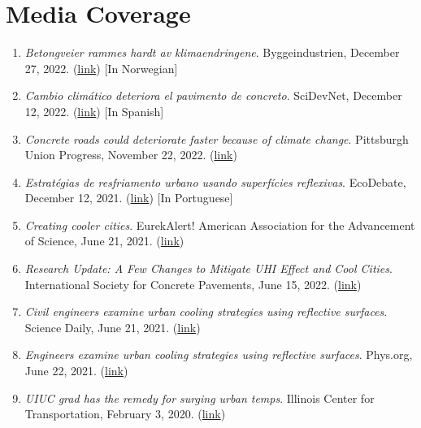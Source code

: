 \documentclass[12pt]{article}
\begin{document}
\bigskip
\section*{Media Coverage}
\hfill
\begin{enumerate}[label=(M\arabic*)]
	\item \textit{Betongveier rammes hardt av klimaendringene}. Byggeindustrien, December 27, 2022. (\href{https://www.bygg.no/betongveier-rammes-hardt-av-klimaendringene/1514889!/}{link}) [In Norwegian]
	\item \textit{Cambio climático deteriora el pavimento de concreto}. SciDevNet, December 12, 2022. (\href{https://www.scidev.net/america-latina/news/cambio-climatico-deteriora-el-pavimento-de-concreto//}{link}) [In Spanish]
	\item \textit{Concrete roads could deteriorate faster because of climate change}. Pittsburgh Union Progress, November 22, 2022. (\href{https://www.unionprogress.com/2022/11/22/concrete-roads-could-deteriorate-faster-because-of-climate-change/}{link})
	\item \textit{Estratégias de resfriamento urbano usando superfícies reflexivas}. EcoDebate, December 12, 2021. (\href{https://www.ecodebate.com.br/2021/06/21/estrategias-de-resfriamento-urbano-usando-superficies-reflexivas/}{link}) [In Portuguese]
	\item \textit{Creating cooler cities}. EurekAlert! American Association for the Advancement of Science, June 21, 2021. (\href{https://www.eurekalert.org/news-releases/536867}{link})
	\item \textit{Research Update: A Few Changes to Mitigate UHI Effect and Cool Cities}. International Society for Concrete Pavements, June 15, 2022. (\href{https://www.concretepavements.org/2021/06/15/18878/}{link})
	\item \textit{Civil engineers examine urban cooling strategies using reflective surfaces}. Science Daily, June 21, 2021. (\href{https://www.sciencedaily.com/releases/2021/06/210621174101.htm}{link})
	\item \textit{Engineers examine urban cooling strategies using reflective surfaces}. Phys.org, June 22, 2021. (\href{https://phys.org/news/2021-06-urban-cooling-strategies-surfaces.html/}{link})
	\item \textit{UIUC grad has the remedy for surging urban temps}. Illinois Center for Transportation, February 3, 2020. (\href{https://ict.illinois.edu/news/newsletters/more-newsletters/february-2020/uiuc-grad-has-the-treatment-for-surging-urban-temps}{link})

\end{enumerate}
\end{document}
